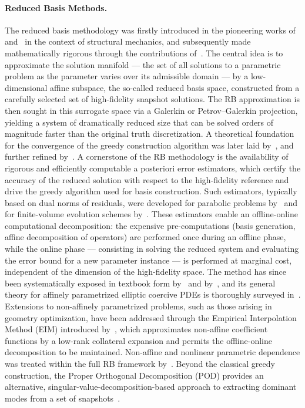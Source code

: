 \documentclass{article}
\begin{document}
\paragraph{Reduced Basis Methods.}
The reduced basis methodology was firstly introduced in the pioneering works of~\cite{almroth1978automatic} and~\cite{noor1980reduced} in the context of structural mechanics, and  subsequently  made mathematically rigorous through the contributions of~\cite{prud2002reliable}. 
The central idea is to approximate the solution manifold — the set of all solutions to a parametric problem as the parameter varies over its admissible domain — by a low-dimensional affine subspace, the so-called reduced basis space, constructed from a carefully selected set of high-fidelity snapshot solutions. 
The RB approximation is then sought in this surrogate space via a Galerkin or Petrov–Galerkin projection, yielding a system of dramatically reduced size that can be solved orders of magnitude faster than the original truth discretization. A theoretical foundation for the convergence of the greedy construction algorithm was later laid by~\cite{buffa2012priori}, and further refined by~\cite{binev2011convergence}. A cornerstone of the RB methodology is the availability of rigorous and efficiently computable a posteriori error estimators, which certify the accuracy of the reduced solution with respect to the high-fidelity reference and drive the greedy algorithm used for basis construction. Such estimators, typically based on dual norms of residuals, were developed for parabolic problems by~\cite{grepl2005posteriori} and for finite-volume evolution schemes by~\cite{haasdonk2008reduced}. 
These estimators enable an offline-online computational decomposition: the expensive pre-computations (basis generation, affine decomposition of operators) are performed once during an offline phase, while the online phase — consisting in solving the reduced system and evaluating the error bound for a new parameter instance — is performed at marginal cost, independent of the dimension of the high-fidelity space. The method has since been systematically exposed in textbook form by~\cite{hesthaven2016certified} and by~\cite{quarteroni2015reduced}, and its general theory for affinely parametrized elliptic coercive PDEs is thoroughly surveyed in~\cite{rozza2008reduced}. Extensions to non-affinely parametrized problems, such as those arising in geometry optimization, have been addressed through the Empirical Interpolation Method (EIM) introduced by~\cite{barrault2004empirical}, which approximates non-affine coefficient functions by a low-rank collateral expansion and permits the offline-online decomposition to be maintained. Non-affine and nonlinear parametric dependence was treated within the full RB framework by~\cite{grepl2007efficient}. Beyond the classical greedy construction, the Proper Orthogonal Decomposition (POD) provides an alternative, singular-value-decomposition-based approach to extracting dominant modes from a set of snapshots~\cite{volkwein2013proper,haasdonk2013convergence}.
\end{document}
